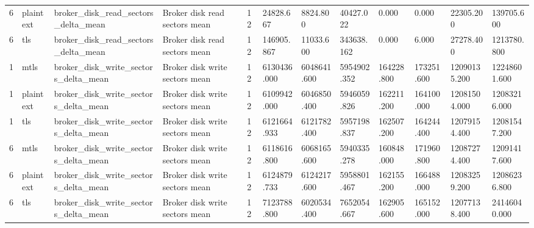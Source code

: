 \begin{longtable}{llllllllllll}
6 & plaintext & broker\_disk\_read\_sectors\_delta\_mean & Broker disk read sectors mean & 12 & 24828.667 & 8824.800 & 40427.022 & 0.000 & 0.000 & 22305.200 & 139705.600 \\
6 & tls & broker\_disk\_read\_sectors\_delta\_mean & Broker disk read sectors mean & 12 & 146905.867 & 11033.600 & 343638.162 & 0.000 & 6.000 & 27278.400 & 1213780.800 \\
1 & mtls & broker\_disk\_write\_sectors\_delta\_mean & Broker disk write sectors mean & 12 & 6130436.000 & 6048641.600 & 5954902.352 & 164228.800 & 173251.600 & 12090135.200 & 12248601.600 \\
1 & plaintext & broker\_disk\_write\_sectors\_delta\_mean & Broker disk write sectors mean & 12 & 6109942.000 & 6046850.400 & 5946059.826 & 162211.200 & 164100.000 & 12081504.000 & 12083216.000 \\
1 & tls & broker\_disk\_write\_sectors\_delta\_mean & Broker disk write sectors mean & 12 & 6121664.933 & 6121782.400 & 5957198.837 & 162507.200 & 164244.400 & 12079154.400 & 12081547.200 \\
6 & mtls & broker\_disk\_write\_sectors\_delta\_mean & Broker disk write sectors mean & 12 & 6118616.800 & 6068165.600 & 5940335.278 & 160848.000 & 171960.800 & 12087274.400 & 12091417.600 \\
6 & plaintext & broker\_disk\_write\_sectors\_delta\_mean & Broker disk write sectors mean & 12 & 6124879.733 & 6124217.600 & 5958801.467 & 162155.200 & 166488.000 & 12083259.200 & 12086236.800 \\
6 & tls & broker\_disk\_write\_sectors\_delta\_mean & Broker disk write sectors mean & 12 & 7123788.800 & 6020534.400 & 7652054.667 & 162905.600 & 165152.000 & 12077138.400 & 24146040.000 \\
\hline
\end{longtable}
